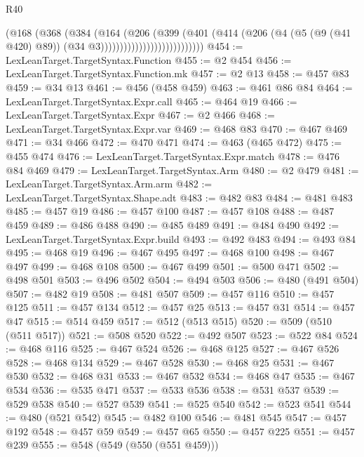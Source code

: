 \begin{lexlean}{R40}
\begin{coremodule}
                                    (@168
                                      (@368
                                        (@384
                                          (@164
                                            (@206
                                              (@399
                                                (@401
                                                  (@414
                                                    (@206
                                                      (@4
                                                        (@5 (@9 (@41 @420) @89))
                                                        (@34 @3)))))))))))))))))))))))))))
@454 := LexLeanTarget.TargetSyntax.Function
@455 := @2 @454
@456 := LexLeanTarget.TargetSyntax.Function.mk
@457 := @2 @13
@458 := @457 @83
@459 := @34 @13
@461 := @456 (@458 @459)
@463 := @461 @86 @84
@464 := LexLeanTarget.TargetSyntax.Expr.call
@465 := @464 @19
@466 := LexLeanTarget.TargetSyntax.Expr
@467 := @2 @466
@468 := LexLeanTarget.TargetSyntax.Expr.var
@469 := @468 @83
@470 := @467 @469
@471 := @34 @466
@472 := @470 @471
@474 := @463 (@465 @472)
@475 := @455 @474
@476 := LexLeanTarget.TargetSyntax.Expr.match
@478 := @476 @84 @469
@479 := LexLeanTarget.TargetSyntax.Arm
@480 := @2 @479
@481 := LexLeanTarget.TargetSyntax.Arm.arm
@482 := LexLeanTarget.TargetSyntax.Shape.adt
@483 := @482 @83
@484 := @481 @483
@485 := @457 @19
@486 := @457 @100
@487 := @457 @108
@488 := @487 @459
@489 := @486 @488
@490 := @485 @489
@491 := @484 @490
@492 := LexLeanTarget.TargetSyntax.Expr.build
@493 := @492 @483
@494 := @493 @84
@495 := @468 @19
@496 := @467 @495
@497 := @468 @100
@498 := @467 @497
@499 := @468 @108
@500 := @467 @499
@501 := @500 @471
@502 := @498 @501
@503 := @496 @502
@504 := @494 @503
@506 := @480 (@491 @504)
@507 := @482 @19
@508 := @481 @507
@509 := @457 @116
@510 := @457 @125
@511 := @457 @134
@512 := @457 @25
@513 := @457 @31
@514 := @457 @47
@515 := @514 @459
@517 := @512 (@513 @515)
@520 := @509 (@510 (@511 @517))
@521 := @508 @520
@522 := @492 @507
@523 := @522 @84
@524 := @468 @116
@525 := @467 @524
@526 := @468 @125
@527 := @467 @526
@528 := @468 @134
@529 := @467 @528
@530 := @468 @25
@531 := @467 @530
@532 := @468 @31
@533 := @467 @532
@534 := @468 @47
@535 := @467 @534
@536 := @535 @471
@537 := @533 @536
@538 := @531 @537
@539 := @529 @538
@540 := @527 @539
@541 := @525 @540
@542 := @523 @541
@544 := @480 (@521 @542)
@545 := @482 @100
@546 := @481 @545
@547 := @457 @192
@548 := @457 @59
@549 := @457 @65
@550 := @457 @225
@551 := @457 @239
@555 := @548 (@549 (@550 (@551 @459)))

\end{coremodule}
\end{lexlean}
